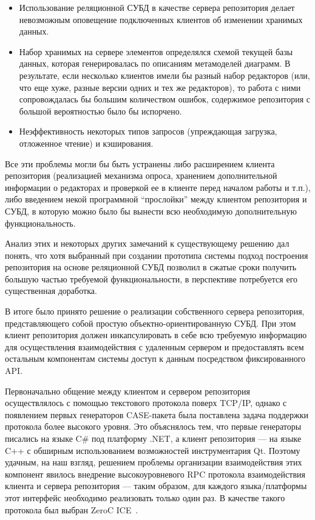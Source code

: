 \documentclass[a5paper]{article}
\begin{document}
\begin{itemize}
  \item Использование реляционной СУБД в качестве сервера репозитория делает
        невозможным оповещение подключенных клиентов об изменении хранимых
        данных.
  \item Набор хранимых на сервере элементов определялся схемой текущей базы
        данных, которая генерировалась по описаниям метамоделей диаграмм. В
        результате, если несколько клиентов имели бы разный набор редакторов (или,
        что еще хуже, разные версии одних и тех же редакторов), то работа с
        ними сопровождалась бы большим количеством ошибок, содержимое
        репозитория с большой вероятностью было бы испорчено.
  \item Неэффективность некоторых типов запросов (упреждающая загрузка,
        отложенное чтение) и кэширования.
\end{itemize}

Все эти проблемы могли бы быть устранены либо расширением клиента
репозитория (реализацией механизма опроса, хранением дополнительной
информации о редакторах и проверкой ее в клиенте перед началом работы
и т.п.), либо введением некой программной ``прослойки'' между клиентом
репозитория и СУБД, в которую можно было бы вынести всю необходимую
дополнительную функциональность.

Анализ этих и некоторых других замечаний к существующему решению дал
понять, что хотя выбранный при создании прототипа системы подход
построения репозитория на основе реляционной СУБД позволил в сжатые
сроки получить большую частью требуемой функциональности, в перспективе
потребуется его существенная доработка. 

В итоге было принято решение о реализации собственного сервера
репозитория, представляющего собой простую объектно-ориентированную
СУБД. При этом клиент репозитория должен инкапсулировать в себе всю
требуемую информацию для осуществления взаимодействия с удаленным
сервером и предоставлять всем остальным компонентам системы доступ к
данным посредством фиксированного API. 

Первоначально общение между клиентом и сервером репозитория
осуществлялось с помощью текстового протокола поверх
TCP/IP, однако с появлением первых генераторов CASE-пакета
была поставлена задача поддержки протокола более высокого уровня. Это
объяснялось тем, что первые генераторы писались на языке
C\# под платформу .NET, а клиент репозитория --- на языке
C++ с обширным использованием возможностей
инструментария Qt. Поэтому удачным, на наш
взгляд, решением проблемы организации взаимодействия этих компонент
явилось внедрение высокоуровневого RPC
протокола взаимодействия клиента и сервера репозитория --- таким образом,
для каждого языка/платформы этот интерфейс необходимо реализовать
только один раз. В качестве такого протокола был выбран
ZeroC ICE~\cite{ice}.
\end{document}
